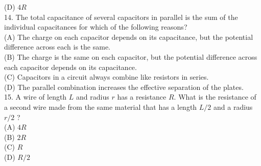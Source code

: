 \begin{enumerate}
(D) $4 R$\\
14. The total capacitance of several capacitors in parallel is the sum of the individual capacitances for which of the following reasons?\\
(A) The charge on each capacitor depends on its capacitance, but the potential difference across each is the same.\\
(B) The charge is the same on each capacitor, but the potential difference across each capacitor depends on its capacitance.\\
(C) Capacitors in a circuit always combine like resistors in series.\\
(D) The parallel combination increases the effective separation of the plates.\\
15. A wire of length $L$ and radius $r$ has a resistance $R$. What is the resistance of a second wire made from the same material that has a length $L / 2$ and a radius $r / 2$ ?\\
(A) $4 R$\\
(B) $2 R$\\
(C) $R$\\
(D) $R / 2$


\end{enumerate}
